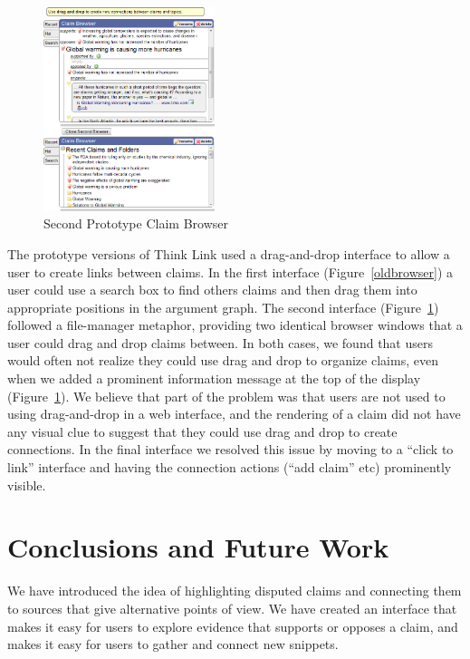 \documentclass{chi2009}
\begin{document}
\begin{figure}[tb]
\begin{center}
	\includegraphics[width=5cm]{../screenshots/claimbrowse.png}
	\caption{Second Prototype Claim Browser}
	\label{secondbrowser}
\end{center}
\end{figure}

The prototype versions of Think Link used a drag-and-drop interface to allow a user to create links between claims. In the first interface (Figure~\ref{oldbrowser}) a user could use a search box to find others claims and then drag them into appropriate positions in the argument graph. The second interface (Figure~\ref{secondbrowser}) followed a file-manager metaphor, providing two identical browser windows that a user could drag and drop claims between. 
In both cases, we found that users would often not realize they could use drag and drop to organize claims, even when we added a prominent information message at the top of the display (Figure~\ref{secondbrowser}). We believe that part of the problem was that users are not used to using drag-and-drop in a web interface, and the rendering of a claim did not have any visual clue to suggest that they could use drag and drop to create connections. In the final interface we resolved this issue by moving to a ``click to link'' interface and having the connection actions (``add claim'' etc) prominently visible.

\section{Conclusions and Future Work}

We have introduced the idea of highlighting disputed claims and connecting them to sources that give alternative points of view. We have created an interface that makes it easy for users to explore evidence that supports or opposes a claim, and makes it easy for users to gather and connect new snippets. 
\end{document}
